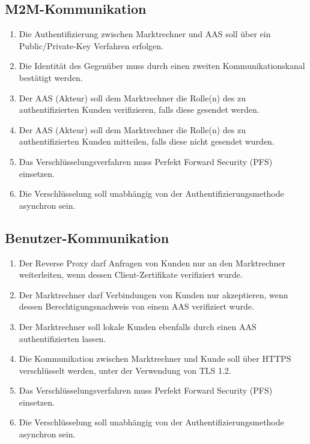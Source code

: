 \documentclass[11pt,a4paper]{report}
\begin{document}
\subsection{M2M-Kommunikation}

\begin{enumerate}
\item[\Square] Die Authentifizierung zwischen Marktrechner und AAS soll über ein Public/Private-Key Verfahren erfolgen.
\item[\Square] Die Identität des Gegenüber muss durch einen zweiten Kommunikationskanal bestätigt werden.
\item[\XBox] Der AAS (Akteur) soll dem Marktrechner die Rolle(n) des zu authentifizierten Kunden verifizieren, falls diese gesendet werden.
\item[\XBox] Der AAS (Akteur) soll dem Marktrechner die Rolle(n) des zu authentifizierten Kunden mitteilen, falls diese nicht gesendet wurden.
\item[\Square] Das Verschlüsselungsverfahren muss Perfekt Forward Security (PFS) einsetzen.
\item[\Square] Die Verschlüsselung soll unabhängig von der Authentifizierungsmethode asynchron sein.
\end{enumerate}

\subsection{Benutzer-Kommunikation} 

\begin{enumerate}
\item[\XBox] Der Reverse Proxy darf Anfragen von Kunden nur an den Marktrechner weiterleiten, wenn dessen Client-Zertifikate verifiziert wurde.
\item[\XBox] Der Marktrechner darf Verbindungen von Kunden nur akzeptieren, wenn dessen Berechtigungsnachweis von einem AAS verifiziert wurde.
\item[\Square] Der Marktrechner soll lokale Kunden ebenfalls durch einen AAS authentifizierten lassen.
\item[\XBox] Die Kommunikation zwischen Marktrechner und Kunde soll über HTTPS verschlüsselt werden, unter der Verwendung von TLS 1.2.
\item[\XBox] Das Verschlüsselungsverfahren muss Perfekt Forward Security (PFS) einsetzen.
\item[\XBox] Die Verschlüsselung soll unabhängig von der Authentifizierungsmethode asynchron sein.
\end{enumerate}
\end{document}

